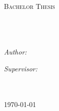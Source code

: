 \documentclass[11pt, oneside]{Thesis} %
\begin{document}
\begin{titlepage}
\begin{center}

\textsc{\LARGE \univname}\\[1.5cm] %
\textsc{\Large Bachelor Thesis}\\[0.5cm] %

\HRule \\[0.4cm] %
{\large \bfseries \ttitle}\\[0.4cm] %
\HRule \\[1.5cm] %
 
\begin{minipage}{0.4\textwidth}
\begin{flushleft} \large
\emph{Author:}\\
\authornames %
\end{flushleft}
\end{minipage}
\begin{minipage}{0.4\textwidth}
\begin{flushright} \large
\emph{Supervisor:} \\
\supname %
\end{flushright}
\end{minipage}\\[8cm]
 

\deptname\\[2cm] %
 
{\large \today}\\[4cm] %
 
\vfill
\end{center}

\end{titlepage}



\end{document}
